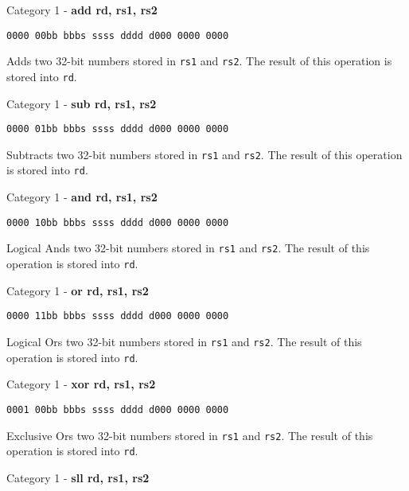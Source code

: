 \documentclass{article}
\begin{document}
\begin{flushleft}
\begin{large}Category 1 - \textbf{add rd, rs1, rs2}\end{large}
\begin{verbatim}0000 00bb bbbs ssss dddd d000 0000 0000\end{verbatim}
Adds two 32-bit numbers stored in \verb|rs1| and \verb|rs2|.
The result of this operation is stored into \verb|rd|.
\newline\newline
\begin{large}Category 1 - \textbf{sub rd, rs1, rs2}\end{large}
\begin{verbatim}0000 01bb bbbs ssss dddd d000 0000 0000\end{verbatim}
Subtracts two 32-bit numbers stored in \verb|rs1| and \verb|rs2|.
The result of this operation is stored into \verb|rd|.
\newline\newline
\begin{large}Category 1 - \textbf{and rd, rs1, rs2}\end{large}
\begin{verbatim}0000 10bb bbbs ssss dddd d000 0000 0000\end{verbatim}
Logical Ands two 32-bit numbers stored in \verb|rs1| and \verb|rs2|.
The result of this operation is stored into \verb|rd|.
\newline\newline
\begin{large}Category 1 - \textbf{or rd, rs1, rs2}\end{large}
\begin{verbatim}0000 11bb bbbs ssss dddd d000 0000 0000\end{verbatim}
Logical Ors two 32-bit numbers stored in \verb|rs1| and \verb|rs2|.
The result of this operation is stored into \verb|rd|.
\newline\newline
\begin{large}Category 1 - \textbf{xor rd, rs1, rs2}\end{large}
\begin{verbatim}0001 00bb bbbs ssss dddd d000 0000 0000\end{verbatim}
Exclusive Ors two 32-bit numbers stored in \verb|rs1| and \verb|rs2|.
The result of this operation is stored into \verb|rd|.
\newline\newline
\begin{large}Category 1 - \textbf{sll rd, rs1, rs2}\end{large}

\end{flushleft}
\end{document}
